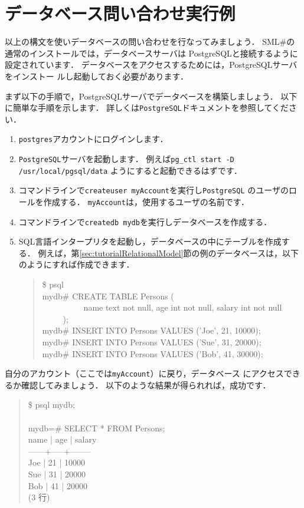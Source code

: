 \documentclass{jbook}
\newcommand{\smlsharp}{SML\#}
\newenvironment{program}{\begin{tt}\begin{quote}}{\end{quote}\end{tt}}
\newcommand{\myem}{\ \ \ \ \  }
\begin{document}
\section{データベース問い合わせ実行例}
\label{sec:tutorialSQLExample}

	以上の構文を使いデータベースの問い合わせを行なってみましょう．
	\smlsharp{}の通常のインストールでは，データベースサーバは
PostgreSQLと接続するように設定されています．
	データベースをアクセスするためには，PostgreSQLサーバをインストー
ルし起動しておく必要があります． 
	
	まず以下の手順で，PostgreSQLサーバでデータベースを構築しましょう．
	以下に簡単な手順を示します．
	詳しくは{\tt PostgreSQL}ドキュメントを参照してください．
\begin{enumerate}
\item {\tt postgres}アカウントにログインします．
\item {\tt PostgreSQL}サーバを起動します．
	例えば{\tt pg\_ctl start -D /usr/local/pgsql/data}
ようにすると起動できるはずです．
\item コマンドラインで{\tt createuser myAccount}を実行し{\tt PostgreSQL}
のユーザのロールを作成する．
	{\tt myAccount}は，使用するユーザの名前です．
\item 
コマンドラインで{\tt createdb mydb}を実行しデータベースを作成する．
\begin{quote}

\end{quote}
\item SQL言語インタープリタを起動し，データベースの中にテーブルを作成す
る．
	例えば，第\ref{sec:tutorialRelationalModel}節の例のデータベースは，以下
のようにすれば作成できます．
\begin{program}
\$ psql\\
mydb\# CREATE TABLE Persons (\\
\myem\myem name text not null, age int not null, salary int not null
\myem );\\
mydb\# INSERT INTO Persons VALUES ('Joe', 21, 10000);\\
mydb\# INSERT INTO Persons VALUES ('Sue', 31, 20000);\\
mydb\# INSERT INTO Persons VALUES ('Bob', 41, 30000);\\
\end{program}
\end{enumerate}
	自分のアカウント（ここでは{\tt myAccount}）に戻り，データベース
にアクセスできるか確認してみましょう．
	以下のような結果が得られれば，成功です．
\begin{program}
\$ psql mydb;\\
\\
mydb=\# SELECT * FROM Persons;\\
 name | age | salary \\
------+-----+--------\\
 Joe  |  21 |  10000\\
 Sue  |  31 |  20000\\
 Bob  |  41 |  20000\\
(3 行)
\end{program}
\end{document}
